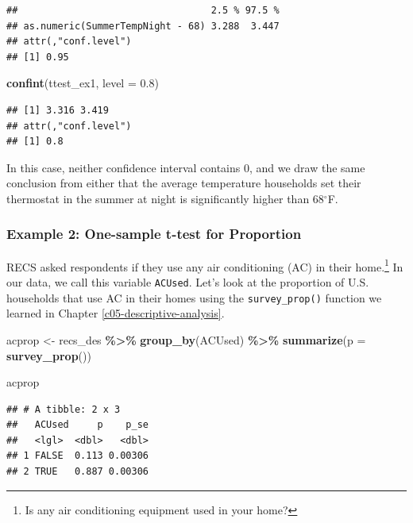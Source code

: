 \documentclass[
]{krantz}
\makeatletter
\newenvironment{Shaded}{\begin{snugshade}}{\end{snugshade}}
\newcommand{\AttributeTok}[1]{\textcolor[rgb]{0.27,0.27,0.27}{#1}}
\newcommand{\FloatTok}[1]{\textcolor[rgb]{0.06,0.06,0.06}{#1}}
\newcommand{\FunctionTok}[1]{\textcolor[rgb]{0.27,0.27,0.27}{\textbf{#1}}}
\newcommand{\NormalTok}[1]{#1}
\newcommand{\OtherTok}[1]{\textcolor[rgb]{0.37,0.37,0.37}{#1}}
\newcommand{\SpecialCharTok}[1]{\textcolor[rgb]{0.43,0.43,0.43}{\textbf{#1}}}
\newenvironment{kframe}{%
\medskip{}
\setlength{\fboxsep}{.8em}
 \def\at@end@of@kframe{}%
 \ifinner\ifhmode%
  \def\at@end@of@kframe{\end{minipage}}%
  \begin{minipage}{\columnwidth}%
 \fi\fi%
 \def\FrameCommand##1{\hskip\@totalleftmargin \hskip-\fboxsep
 \colorbox{shadecolor}{##1}\hskip-\fboxsep
     \hskip-\linewidth \hskip-\@totalleftmargin \hskip\columnwidth}%
 \MakeFramed {\advance\hsize-\width
   \@totalleftmargin\z@ \linewidth\hsize
   \@setminipage}}%
 {\par\unskip\endMakeFramed%
 \at@end@of@kframe}
\renewenvironment{Shaded}{\begin{kframe}}{\end{kframe}}
\makeatother
\begin{document}
\begin{verbatim}
##                                  2.5 % 97.5 %
## as.numeric(SummerTempNight - 68) 3.288  3.447
## attr(,"conf.level")
## [1] 0.95
\end{verbatim}

\begin{Shaded}
\begin{Highlighting}[]
\FunctionTok{confint}\NormalTok{(ttest\_ex1, }\AttributeTok{level =} \FloatTok{0.8}\NormalTok{)}
\end{Highlighting}
\end{Shaded}

\begin{verbatim}
## [1] 3.316 3.419
## attr(,"conf.level")
## [1] 0.8
\end{verbatim}

In this case, neither confidence interval contains 0, and we draw the same conclusion from either that the average temperature households set their thermostat in the summer at night is significantly higher than 68\(^\circ\)F.

\hypertarget{stattest-ttest-ex2}{%
\subsubsection*{Example 2: One-sample t-test for Proportion}\label{stattest-ttest-ex2}}


RECS asked respondents if they use any air conditioning (AC) in their home.\footnote{Is any air conditioning equipment used in your home?} In our data, we call this variable \texttt{ACUsed}. Let's look at the proportion of U.S. households that use AC in their homes using the \texttt{survey\_prop()} function we learned in Chapter \ref{c05-descriptive-analysis}.

\begin{Shaded}
\begin{Highlighting}[]
\NormalTok{acprop }\OtherTok{\textless{}{-}}\NormalTok{ recs\_des }\SpecialCharTok{\%\textgreater{}\%}
  \FunctionTok{group\_by}\NormalTok{(ACUsed) }\SpecialCharTok{\%\textgreater{}\%}
  \FunctionTok{summarize}\NormalTok{(}\AttributeTok{p =} \FunctionTok{survey\_prop}\NormalTok{())}

\NormalTok{acprop}
\end{Highlighting}
\end{Shaded}

\begin{verbatim}
## # A tibble: 2 x 3
##   ACUsed     p    p_se
##   <lgl>  <dbl>   <dbl>
## 1 FALSE  0.113 0.00306
## 2 TRUE   0.887 0.00306
\end{verbatim}
\end{document}
